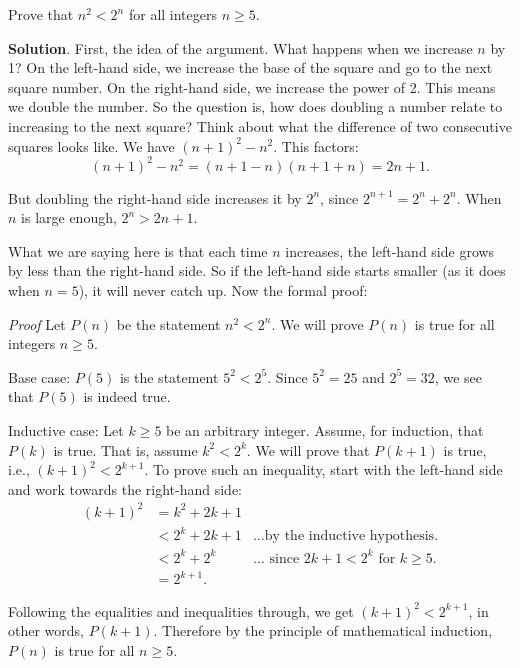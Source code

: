 \documentclass[11pt,]{book}
\makeatletter
\theoremstyle{ptxplainnotitle}
\theoremstyle{ptxplaintitle}
\renewcommand*{\proofname}{Proof}
\renewenvironment{proof}[1][\proofname]{\par
  \pushQED{\qed}%
  \normalfont \topsep6\p@\@plus6\p@\relax
  \trivlist
  \item\relax
    {\itshape
    #1\@addpunct{.}}\hspace\labelsep\ignorespaces
}{%
  \popQED\endtrivlist\@endpefalse
}
\theoremstyle{ptxdefinitionnotitle}
\theoremstyle{ptxdefinitiontitle}
\theoremstyle{ptxdefinitionnotitle}
\theoremstyle{ptxdefinitiontitle}
\theoremstyle{ptxdefinitionnotitle}
\theoremstyle{ptxdefinitiontitle}
\theoremstyle{ptxdefinitiontitlenonumber}
\theoremstyle{ptxdefinitiontitlenonumber}
\numberwithin{equation}{chapter}
\newcommand{\lt}{<}
\newcommand{\amp}{&}
\makeatother
\begin{document}
\begin{example}\label{example-27}
\hypertarget{p-567}{}%
Prove that \(n^2 \lt  2^n\) for all integers \(n \ge 5\).%
\par\smallskip%
\noindent\textbf{Solution}.\hypertarget{solution-77}{}\quad%
\hypertarget{p-568}{}%
First, the idea of the argument. What happens when we increase \(n\) by 1? On the left-hand side, we increase the base of the square and go to the next square number. On the right-hand side, we increase the power of 2. This means we double the number. So the question is, how does doubling a number relate to increasing to the next square? Think about what the difference of two consecutive squares looks like. We have \((n+1)^2 - n^2\). This factors:%
\begin{equation*}
(n+1)^2 - n^2 = (n+1-n)(n+1+n) = 2n+1.
\end{equation*}
%
\par
\hypertarget{p-569}{}%
But doubling the right-hand side increases it by \(2^n\), since \(2^{n+1} = 2^n + 2^n\). When \(n\) is large enough, \(2^n > 2n + 1\).%
\par
\hypertarget{p-570}{}%
What we are saying here is that each time \(n\) increases, the left-hand side grows by less than the right-hand side. So if the left-hand side starts smaller (as it does when \(n = 5\)), it will never catch up. Now the formal proof:%
\begin{proof}\hypertarget{proof-4}{}
\hypertarget{p-571}{}%
Let \(P(n)\) be the statement \(n^2 \lt  2^n\). We will prove \(P(n)\) is true for all integers \(n \ge 5\).%
\par
\hypertarget{p-572}{}%
Base case: \(P(5)\) is the statement \(5^2 \lt  2^5\). Since \(5^2 = 25\) and \(2^5 = 32\), we see that \(P(5)\) is indeed true.%
\par
\hypertarget{p-573}{}%
Inductive case: Let \(k \ge 5\) be an arbitrary integer. Assume, for induction, that \(P(k)\) is true. That is, assume \(k^2 \lt  2^k\). We will prove that \(P(k+1)\) is true, i.e., \((k+1)^2 \lt  2^{k+1}\). To prove such an inequality, start with the left-hand side and work towards the right-hand side:%
\begin{align*}
(k+1)^2 \amp = k^2 + 2k + 1 \amp\\
\amp \lt 2^k + 2k + 1 \amp \ldots\text{by the inductive hypothesis.}\\
\amp \lt 2^k + 2^k \amp \ldots\text{ since } 2k + 1 \lt  2^k \text{ for }k \ge 5.\\
\amp = 2^{k+1}. \amp
\end{align*}
%
\par
\hypertarget{p-574}{}%
Following the equalities and inequalities through, we get \((k+1)^2 \lt  2^{k+1}\), in other words, \(P(k+1)\). Therefore by the principle of mathematical induction, \(P(n)\) is true for all \(n \ge 5\).%
\end{proof}
\end{example}
\end{document}

